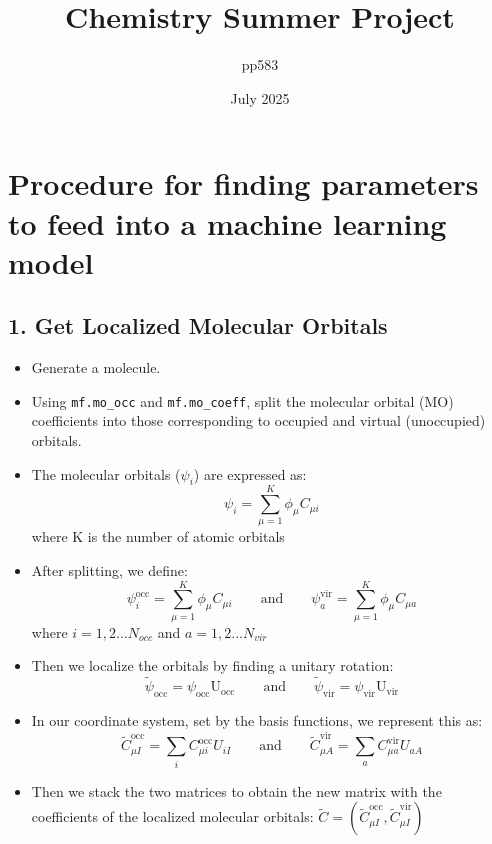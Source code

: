 \documentclass{article}
\title{Chemistry Summer Project}
\author{pp583}
\date{July 2025}
\begin{document}
\maketitle

\section{Procedure for finding parameters to feed into a machine learning model}

\subsection*{1. Get Localized Molecular Orbitals}

\begin{itemize}
    \item Generate a molecule.

    \item Using \verb|mf.mo_occ| and \verb|mf.mo_coeff|, split the molecular orbital (MO) coefficients into those corresponding to occupied and virtual (unoccupied) orbitals.

    \item The molecular orbitals ($\psi_i$) are expressed as:
    \[
    \psi_i = \sum_{\mu=1}^{K} \phi_\mu C_{\mu i}
    \]
    where K is the number of atomic orbitals
    \item After splitting, we define:
    \[
    \psi_i^{\mathrm{occ}} = \sum_{\mu=1}^{K} \phi_\mu C_{\mu i}
    \qquad \text{and} \qquad
    \psi_a^{\mathrm{vir}} = \sum_{\mu=1}^{K} \phi_\mu C_{\mu a}
    \]
    where $i = 1,2...N_{occ}$ and $a = 1,2...N_{vir} $
    \item Then we localize the orbitals by finding a unitary rotation:
    \[
    \widetilde{\psi}_{\mathrm{occ}} = \psi_{\mathrm{occ}} \mathrm{U}_{\mathrm{occ}}
    \qquad \text{and} \qquad
    \widetilde{\psi}_{\mathrm{vir}} = \psi_{\mathrm{vir}} \mathrm{U}_{\mathrm{vir}}
    \]

    \item In our coordinate system, set by the basis functions, we represent this as:
    \[
    \widetilde{C}_{\mu I}^{\mathrm{occ}} = \sum_{i} C_{\mu i}^{\mathrm{occ}} U_{iI}
    \qquad \text{and} \qquad
    \widetilde{C}_{\mu A}^{\mathrm{vir}} = \sum_{a} C_{\mu a}^{\mathrm{vir}} U_{aA}
    \]

    \item Then we stack the two matrices to obtain the new matrix with the coefficients of the localized molecular orbitals: \( \widetilde{C}  = (\widetilde{C}_{\mu I}^{\mathrm{occ}}, \widetilde{C}_{\mu I}^{\mathrm{vir}})\)
\end{itemize}
\end{document}
